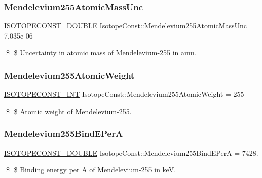 \subsubsection{\texorpdfstring{Mendelevium255\+Atomic\+Mass\+Unc}{Mendelevium255AtomicMassUnc}}
{\footnotesize\ttfamily \mbox{\hyperlink{group___isotope_const-_macros_ga8f45a7272ce02c0b4c65c44636ed719a}{I\+S\+O\+T\+O\+P\+E\+C\+O\+N\+S\+T\+\_\+\+D\+O\+U\+B\+LE}} Isotope\+Const\+::\+Mendelevium255\+Atomic\+Mass\+Unc = 7.\+035e-\/06}

\$ \$ Uncertainty in atomic mass of Mendelevium-\/255 in amu. \mbox{\label{group___isotope_const-_mendelevium-_md255_gabdeb551d3b83fd538ad6ae70913a2c54}} 
\subsubsection{\texorpdfstring{Mendelevium255\+Atomic\+Weight}{Mendelevium255AtomicWeight}}
{\footnotesize\ttfamily \mbox{\hyperlink{group___isotope_const-_macros_ga5f18360b3e99483a35c32d789e62621c}{I\+S\+O\+T\+O\+P\+E\+C\+O\+N\+S\+T\+\_\+\+I\+NT}} Isotope\+Const\+::\+Mendelevium255\+Atomic\+Weight = 255}

\$ \$ Atomic weight of Mendelevium-\/255. \mbox{\label{group___isotope_const-_mendelevium-_md255_ga72ee01956b7fd25dd403d83432c44ab7}} 
\subsubsection{\texorpdfstring{Mendelevium255\+Bind\+E\+PerA}{Mendelevium255BindEPerA}}
{\footnotesize\ttfamily \mbox{\hyperlink{group___isotope_const-_macros_ga8f45a7272ce02c0b4c65c44636ed719a}{I\+S\+O\+T\+O\+P\+E\+C\+O\+N\+S\+T\+\_\+\+D\+O\+U\+B\+LE}} Isotope\+Const\+::\+Mendelevium255\+Bind\+E\+PerA = 7428.}

\$ \$ Binding energy per A of Mendelevium-\/255 in keV. \mbox{\label{group___isotope_const-_mendelevium-_md255_ga088502dc0131153780d79677e17cfcfb}} 

